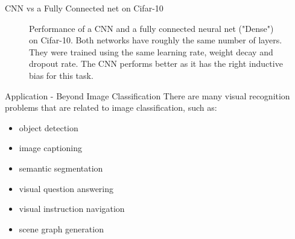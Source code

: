 \begin{frame} {CNN vs a Fully Connected net on Cifar-10}
  \begin{figure}
        \centering
        \caption{Performance of a CNN and a fully connected neural net ("Dense") on Cifar-10. Both networks have roughly the same number of layers. They were trained using the same learning rate, weight decay and dropout rate. The CNN performs better as it has the right inductive bias for this task.}
    \end{figure} 
\end{frame}
\begin{vbframe}{Application - Beyond Image Classification}
There are many visual recognition problems that are related to image classification, such as:

\begin{itemize}
    \item object detection
    \item image captioning
    \item semantic segmentation
    \item visual question answering
    \item visual instruction navigation
    \item scene graph generation
\end{itemize}
\end{vbframe}



